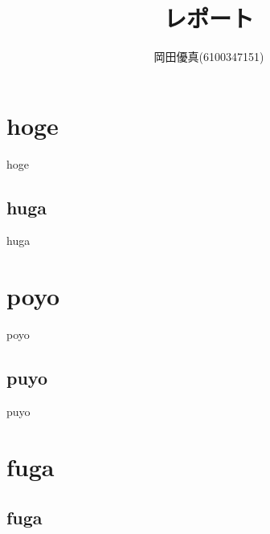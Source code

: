 \documentclass[uplatex,dvipdfmx,a4paper,11pt]{jsarticle}
\title{レポート}
\author{岡田優真(6100347151)}
\date{}
\begin{document}
\maketitle

\section{hoge}

hoge

\subsection{huga}

huga

\section{poyo}

poyo

\subsection{puyo}

puyo

\section{fuga}

\subsection{fuga}
\end{document}
